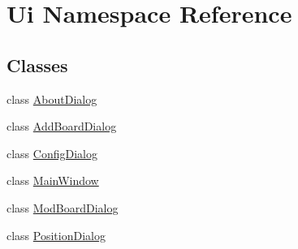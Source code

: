 \hypertarget{namespace_ui}{}\section{Ui Namespace Reference}
\label{namespace_ui}
\subsection*{Classes}
\begin{DoxyCompactItemize}
\item 
class \hyperlink{class_ui_1_1_about_dialog}{About\+Dialog}
\item 
class \hyperlink{class_ui_1_1_add_board_dialog}{Add\+Board\+Dialog}
\item 
class \hyperlink{class_ui_1_1_config_dialog}{Config\+Dialog}
\item 
class \hyperlink{class_ui_1_1_main_window}{Main\+Window}
\item 
class \hyperlink{class_ui_1_1_mod_board_dialog}{Mod\+Board\+Dialog}
\item 
class \hyperlink{class_ui_1_1_position_dialog}{Position\+Dialog}
\end{DoxyCompactItemize}
